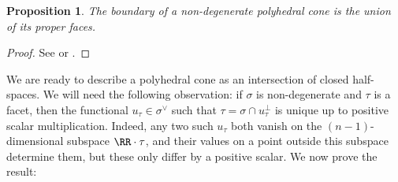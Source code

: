 \documentclass[12pt]{amsart}
\theoremstyle{plain}
\newtheorem{proposition}[theorem]{Proposition}
\theoremstyle{definition}
\begin{document}
\begin{proposition}\label{proposition:boundary}
The boundary of a non-degenerate polyhedral cone is the union of its proper faces.
\end{proposition}
\begin{proof}
See \cite[\S 1.2]{Fulton93} or \cite[\S 1]{Zaman13}.
\end{proof}

%

We are ready to describe a polyhedral cone as an intersection of closed half-spaces.
We will need the following observation:
if $\sigma$ is non-degenerate and $\tau$ is a facet, then the functional $u_\tau \in \sigma^\vee$ such that $\tau = \sigma \cap u_\tau^\perp$ is unique up to positive scalar multiplication.
Indeed, any two such $u_\tau$ both vanish on the $(n-1)$-dimensional subspace $\RR \cdot \tau$, and their values on a point outside this subspace determine them, but these only differ by a positive scalar.
We now prove the result:
\end{document}
